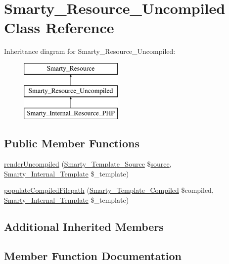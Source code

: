 \hypertarget{class_smarty___resource___uncompiled}{}\section{Smarty\+\_\+\+Resource\+\_\+\+Uncompiled Class Reference}
\label{class_smarty___resource___uncompiled}
Inheritance diagram for Smarty\+\_\+\+Resource\+\_\+\+Uncompiled\+:\begin{figure}[H]
\begin{center}
\leavevmode
\includegraphics[height=3.000000cm]{class_smarty___resource___uncompiled}
\end{center}
\end{figure}
\subsection*{Public Member Functions}
\begin{DoxyCompactItemize}
\item 
\hyperlink{class_smarty___resource___uncompiled_ae2d36f1295b1850aab7d985e92bafb15}{render\+Uncompiled} (\hyperlink{class_smarty___template___source}{Smarty\+\_\+\+Template\+\_\+\+Source} \$\hyperlink{class_smarty___resource_ab6ac6b66dac2da6c41a178102f7d53e4}{source}, \hyperlink{class_smarty___internal___template}{Smarty\+\_\+\+Internal\+\_\+\+Template} \$\+\_\+template)
\item 
\hyperlink{class_smarty___resource___uncompiled_a86942e3e87336b2ffea8a520eeae8428}{populate\+Compiled\+Filepath} (\hyperlink{class_smarty___template___compiled}{Smarty\+\_\+\+Template\+\_\+\+Compiled} \$compiled, \hyperlink{class_smarty___internal___template}{Smarty\+\_\+\+Internal\+\_\+\+Template} \$\+\_\+template)
\end{DoxyCompactItemize}
\subsection*{Additional Inherited Members}


\subsection{Member Function Documentation}
\hypertarget{class_smarty___resource___uncompiled_a86942e3e87336b2ffea8a520eeae8428}{}
